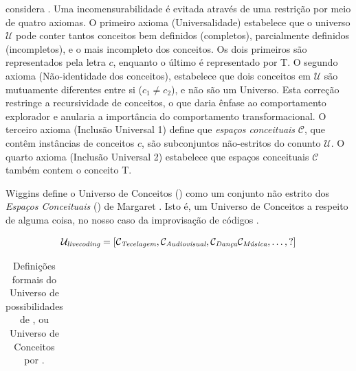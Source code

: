 { considera  . Uma incomensurabilidade é evitada através de uma restrição por meio de quatro axiomas. O primeiro axioma (Universalidade) estabelece que o universo $\mathcal{U}$ pode conter tantos conceitos bem definidos (completos), parcialmente definidos (incompletos), e  o mais incompleto dos conceitos. Os dois primeiros são representados pela letra $c$, enquanto o último é representado por \small{T}. O segundo axioma (Não-identidade dos conceitos), estabelece que dois conceitos em  $\mathcal{U}$ são mutuamente diferentes entre si ($c_1 \neq c_2$), e não são um Universo. Esta correção restringe a recursividade de conceitos, o que daria ênfase ao comportamento explorador e anularia a importância do comportamento transformacional. O terceiro axioma (Inclusão Universal 1) define que \emph{espaços conceituais} $\mathcal{C}$, que contêm instâncias de conceitos $c$, são subconjuntos não-estritos do conunto $\mathcal{U}$. O quarto axioma (Inclusão Universal 2) estabelece que espaços conceituais $\mathcal{C}$ também contem o conceito \small{T}.






 Wiggins define o Universo de Conceitos () como um conjunto não estrito dos \emph{Espaços Conceituais} () de Margaret . Isto é, um Universo de Conceitos a respeito de alguma coisa, no nosso caso da improvisação de códigos . 

\begin{equation}
\mathcal{U}_\emph{livecoding} = [\mathcal{C}_\emph{Tecelagem}, \mathcal{C}_\emph{Audiovisual}, \mathcal{C}_\emph{Dança} \mathcal{C}_\emph{Música}, \ldots, ?]
\end{equation}\label{eq:ul}

\begin{table}[!h]
\caption{Definições formais do Universo de possibilidades de , ou Universo de Conceitos por .}
\small
    \begin{tabular}{ | p{4.25cm} | p{5.25cm} | p{5.25cm} |}
    \hline 
    \hline 


\end{tabular}
\end{table}}
